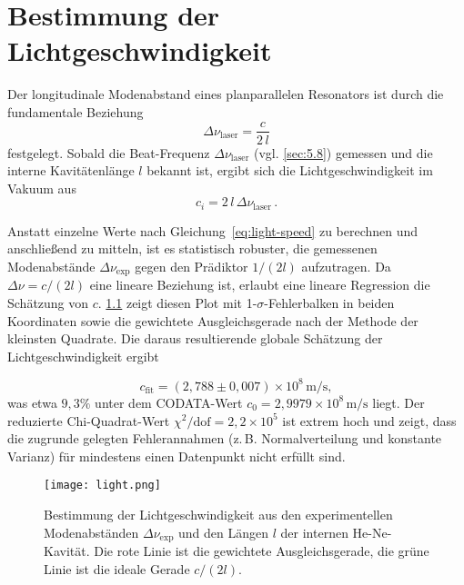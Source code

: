  
 
\chapter{Bestimmung der Lichtgeschwindigkeit}

Der longitudinale Modenabstand eines planparallelen Resonators ist durch die fundamentale Beziehung  
\begin{equation*}
  \Delta\nu_{\mathrm{laser}} = \frac{c}{2\,l}
\end{equation*}
festgelegt. 
Sobald die Beat-Frequenz \(\Delta\nu_{\mathrm{laser}}\) (vgl. \cref{sec:5.8}) gemessen und die interne Kavitätenlänge \(l\) bekannt ist, ergibt sich die Lichtgeschwindigkeit im Vakuum aus  
\begin{equation} \label{eq:light-speed}
  c_i = 2\,l\,\Delta\nu_{\mathrm{laser}}\,.
\end{equation}

Anstatt einzelne Werte nach Gleichung~\eqref{eq:light-speed} zu berechnen und anschließend zu mitteln, ist es statistisch robuster, die gemessenen Modenabstände \(\Delta\nu_{\mathrm{exp}}\) gegen den Prädiktor \(1/(2l)\) aufzutragen. 
Da \(\Delta\nu = c/(2l)\) eine lineare Beziehung ist, erlaubt eine lineare Regression die Schätzung von \(c\). 
\cref{fig:light-speed} zeigt diesen Plot mit 1-\(\sigma\)-Fehlerbalken in beiden Koordinaten sowie die gewichtete Ausgleichsgerade nach der Methode der kleinsten Quadrate. Die daraus resultierende globale Schätzung der Lichtgeschwindigkeit ergibt  

\[
  c_{\mathrm{fit}} = (2{,}788 \pm 0{,}007)\times10^{8}\,\mathrm{m/s},
\]  
was etwa \(9{,}3\%\) unter dem CODATA-Wert \cite{codata} \(c_0 = 2{,}9979\times10^{8}\,\mathrm{m/s}\) liegt. Der reduzierte Chi-Quadrat-Wert  
\(\chi^2/\mathrm{dof} = 2{,}2\times10^5\)  
ist extrem hoch und zeigt, dass die zugrunde gelegten Fehlerannahmen (z.\,B. Normalverteilung und konstante Varianz) für mindestens einen Datenpunkt nicht erfüllt sind.

\begin{figure}
  \centering
  \texttt{[image: light.png]}
  \caption{Bestimmung der Lichtgeschwindigkeit aus den experimentellen Modenabständen \(\Delta\nu_{\mathrm{exp}}\) und den Längen \(l\) der internen He-Ne-Kavität. Die rote Linie ist die gewichtete Ausgleichsgerade, die grüne Linie ist die ideale Gerade \(c/(2l)\).}
  \label{fig:light-speed}
\end{figure}

